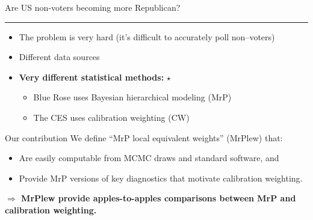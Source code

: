 
\begin{frame}{Are US non-voters becoming more Republican?}

\vspace{1em}
\pause
%
\hrule
\begin{itemize}
\item The problem is very hard (it's difficult to accurately poll non--voters)
\item Different data sources
%
%
\item \textbf{Very different statistical methods:} $\star$
\begin{itemize}
    \item Blue Rose uses Bayesian hierarchical modeling (MrP)
    \item The CES uses calibration weighting (CW)
\end{itemize}
%
\end{itemize}

\pause

\begin{block}{Our contribution}
    We define ``MrP local equivalent weights'' (MrPlew) that:
\begin{itemize}
    \item Are easily computable from MCMC draws and standard software, and
    \item Provide MrP versions of key diagnostics that motivate calibration weighting.
\end{itemize}
%
\textbf{$\Rightarrow$ MrPlew provide apples-to-apples comparisons between
MrP and calibration weighting.}
%
\end{block}

\end{frame}


